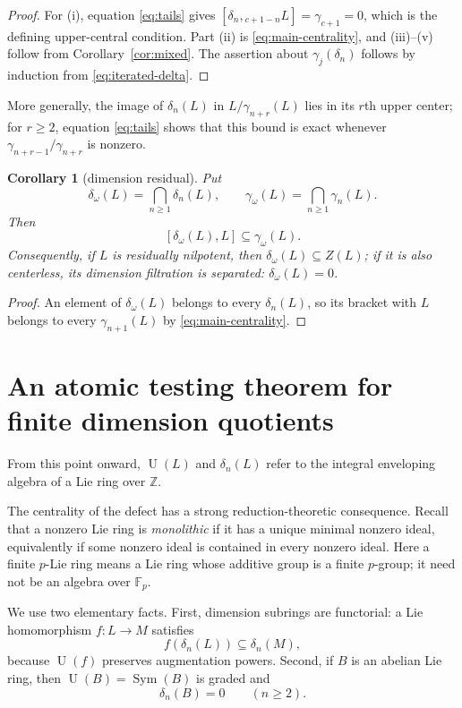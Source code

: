 \documentclass[a4paper,11pt,reqno]{amsart}
\newtheorem{corollary}[theorem]{Corollary}
\theoremstyle{definition}
\theoremstyle{remark}
\newcommand{\Z}{\mathbb Z}
\newcommand{\U}{\operatorname U}
\newcommand{\dlt}{\delta}
\newcommand{\gm}{\gamma}
\newcommand{\Sym}{\operatorname{Sym}}
\begin{document}
\begin{proof}
For (i), equation \eqref{eq:tails} gives
$[\dlt_n,{}_{c+1-n}L]=\gm_{c+1}=0$, which is the defining upper-central
condition.  Part (ii) is \eqref{eq:main-centrality}, and (iii)--(v) follow
from Corollary~\ref{cor:mixed}.  The assertion about
$\gm_j(\dlt_n)$ follows by induction from \eqref{eq:iterated-delta}.
\end{proof}

More generally, the image of $\dlt_n(L)$ in $L/\gm_{n+r}(L)$ lies in its
$r$th upper center; for $r\geq2$, equation \eqref{eq:tails} shows that this
bound is exact whenever $\gm_{n+r-1}/\gm_{n+r}$ is nonzero.

\begin{corollary}[dimension residual]\label{cor:residual}
Put
\[
 \dlt_\omega(L)=\bigcap_{n\geq1}\dlt_n(L),\qquad
 \gm_\omega(L)=\bigcap_{n\geq1}\gm_n(L).
\]
Then
\[
                  [\dlt_\omega(L),L]\subseteq\gm_\omega(L).
\]
Consequently, if $L$ is residually nilpotent, then
$\dlt_\omega(L)\subseteq Z(L)$; if it is also centerless, its dimension
filtration is separated: $\dlt_\omega(L)=0$.
\end{corollary}

\begin{proof}
An element of $\dlt_\omega(L)$ belongs to every $\dlt_n(L)$, so its bracket
with $L$ belongs to every $\gm_{n+1}(L)$ by
\eqref{eq:main-centrality}.
\end{proof}

\section{An atomic testing theorem for finite dimension quotients}

From this point onward, $\U(L)$ and $\dlt_n(L)$ refer to the integral
enveloping algebra of a Lie ring over $\Z$.

The centrality of the defect has a strong reduction-theoretic consequence.
Recall that a nonzero Lie ring is \emph{monolithic} if it has a unique minimal
nonzero ideal, equivalently if some nonzero ideal is contained in every
nonzero ideal.
Here a finite $p$-Lie ring means a Lie ring whose additive group is a finite
$p$-group; it need not be an algebra over $\mathbb F_p$.

We use two elementary facts.  First, dimension subrings are functorial: a Lie
homomorphism $f:L\to M$ satisfies
\begin{equation}\label{eq:functoriality}
                       f(\dlt_n(L))\subseteq\dlt_n(M),
\end{equation}
because $\U(f)$ preserves augmentation powers.  Second, if $B$ is an abelian
Lie ring, then $\U(B)=\Sym(B)$ is graded and
\begin{equation}\label{eq:abelian-dimension}
                       \dlt_n(B)=0\qquad(n\geq2).
\end{equation}
\end{document}
